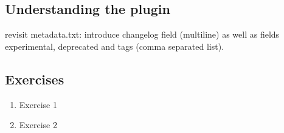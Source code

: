 \subsection{Understanding the plugin}
\label{ssect:understanding_plugin_2}
revisit metadata.txt: introduce changelog field (multiline) as well as fields experimental, deprecated and tags (comma separated list).

\subsection{Exercises}
\label{ssect:plugin_1_exercises}
\begin{enumerate}
\item Exercise 1
\item Exercise 2
\end{enumerate}
